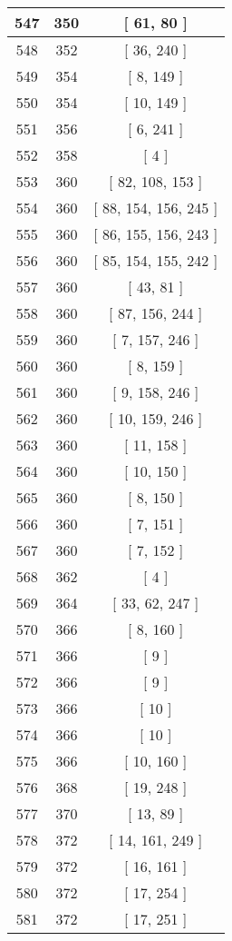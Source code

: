 \begin{center}
\begin{longtable}[H]{|| c c c ||}
\\\hline
547 & 350 & [ 61, 80 ]
\\\hline
548 & 352 & [ 36, 240 ]
\\\hline
549 & 354 & [ 8, 149 ]
\\\hline
550 & 354 & [ 10, 149 ]
\\\hline
551 & 356 & [ 6, 241 ]
\\\hline
552 & 358 & [ 4 ]
\\\hline
553 & 360 & [ 82, 108, 153 ]
\\\hline
554 & 360 & [ 88, 154, 156, 245 ]
\\\hline
555 & 360 & [ 86, 155, 156, 243 ]
\\\hline
556 & 360 & [ 85, 154, 155, 242 ]
\\\hline
557 & 360 & [ 43, 81 ]
\\\hline
558 & 360 & [ 87, 156, 244 ]
\\\hline
559 & 360 & [ 7, 157, 246 ]
\\\hline
560 & 360 & [ 8, 159 ]
\\\hline
561 & 360 & [ 9, 158, 246 ]
\\\hline
562 & 360 & [ 10, 159, 246 ]
\\\hline
563 & 360 & [ 11, 158 ]
\\\hline
564 & 360 & [ 10, 150 ]
\\\hline
565 & 360 & [ 8, 150 ]
\\\hline
566 & 360 & [ 7, 151 ]
\\\hline
567 & 360 & [ 7, 152 ]
\\\hline
568 & 362 & [ 4 ]
\\\hline
569 & 364 & [ 33, 62, 247 ]
\\\hline
570 & 366 & [ 8, 160 ]
\\\hline
571 & 366 & [ 9 ]
\\\hline
572 & 366 & [ 9 ]
\\\hline
573 & 366 & [ 10 ]
\\\hline
574 & 366 & [ 10 ]
\\\hline
575 & 366 & [ 10, 160 ]
\\\hline
576 & 368 & [ 19, 248 ]
\\\hline
577 & 370 & [ 13, 89 ]
\\\hline
578 & 372 & [ 14, 161, 249 ]
\\\hline
579 & 372 & [ 16, 161 ]
\\\hline
580 & 372 & [ 17, 254 ]
\\\hline
581 & 372 & [ 17, 251 ]
\\\hline

\end{longtable}
\end{center}
